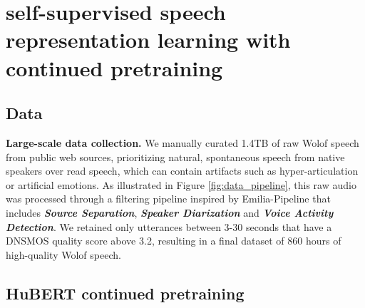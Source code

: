 \documentclass{article}
\newcommand{\myparagraph}[1]{\noindent\textbf{#1}}
\begin{document}
\section{self-supervised speech representation learning with continued pretraining}
\label{sec:hubert}

\subsection{Data}
\myparagraph{Large-scale 
data collection.} We manually curated 1.4TB of raw Wolof speech from public web sources, prioritizing natural, spontaneous speech from native speakers over read speech, which can contain artifacts such as hyper-articulation or artificial emotions. As illustrated in Figure \ref{fig:data_pipeline}, this raw audio was processed through a filtering pipeline inspired by Emilia-Pipeline \cite{emilia, emilialarge, amphion} that includes \textbf{\textit{Source Separation}}, \textbf{\textit{Speaker Diarization}} and \textbf{\textit{Voice Activity Detection}}. We retained only utterances between 3-30 seconds that have a DNSMOS \cite{dnsmos} quality score above 3.2, resulting in a final dataset of 860 hours of high-quality Wolof speech. 

\subsection{HuBERT continued pretraining}
\end{document}
